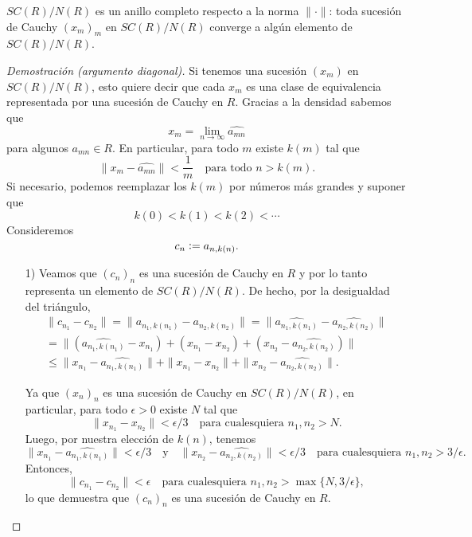 \documentclass{article}
\numberwithin{equation}{section}
\theoremstyle{definition}
\begin{document}
\begin{lema}
  $SC (R) / N (R)$ es un anillo completo respecto a la norma $\|\cdot\|$:
  toda sucesión de Cauchy $(x_m)_m$ en $SC (R)/N (R)$ converge a algún elemento
  de $SC (R)/N (R)$.

  \begin{proof}[Demostración (argumento diagonal)]
    Si tenemos una sucesión $(x_m)$ en $SC (R)/N (R)$, esto quiere decir que
    cada $x_m$ es una clase de equivalencia representada por una sucesión
    de Cauchy en $R$. Gracias a la densidad sabemos que
    $$x_m = \lim_{n\to\infty} \widehat{a_{mn}}$$
    para algunos $a_{mn}\in R$. En particular, para todo $m$ existe $k (m)$ tal
    que
    $$\|x_m - \widehat{a_{mn}}\| < \frac{1}{m}\quad\text{para todo }n > k (m).$$
    Si necesario, podemos reemplazar los $k (m)$ por números más grandes
    y suponer que
    $$k (0) < k (1) < k (2) < \cdots$$
    Consideremos
    $$c_n \mathrel{\mathop:}= a_{n,k(n)}.$$

    \begin{enumerate}
    \item[1)] Veamos que $(c_n)_n$ es una sucesión de Cauchy en $R$
      y por lo tanto representa un elemento de $SC (R)/N(R)$.
      De hecho, por la desigualdad del triángulo,
      \begin{multline*}
        \|c_{n_1} - c_{n_2}\| =
        \|a_{n_1,k(n_1)} - a_{n_2,k(n_2)}\| =
        \|\widehat{a_{n_1,k(n_1)}} - \widehat{a_{n_2,k(n_2)}}\| \\
      = \|(\widehat{a_{n_1,k(n_1)}} - x_{n_1}) + (x_{n_1} - x_{n_2}) + (x_{n_2} - \widehat{a_{n_2,k(n_2)}})\| \\
    \le \|x_{n_1} - \widehat{a_{n_1,k(n_1)}}\| + \|x_{n_1} - x_{n_2}\| + \|x_{n_2} - \widehat{a_{n_2,k(n_2)}}\|.
      \end{multline*}

      Ya que $(x_n)_n$ es una sucesión de Cauchy en $SC (R) / N (R)$,
      en particular, para todo $\epsilon > 0$ existe $N$ tal que
      $$\|x_{n_1} - x_{n_2}\| < \epsilon/3\quad\text{para cualesquiera }n_1,n_2 > N.$$
      Luego, por nuestra elección de $k (n)$, tenemos
      \[ \|x_{n_1} - \widehat{a_{n_1,k(n_1)}}\| < \epsilon/3
         \quad\text{y}\quad
         \|x_{n_2} - \widehat{a_{n_2,k(n_2)}}\| < \epsilon/3
         \quad\text{para cualesquiera }n_1,n_2 > 3/\epsilon. \]
      Entonces,
      \[ \|c_{n_1} - c_{n_2}\| < \epsilon
         \quad\text{para cualesquiera }n_1, n_2 > \max \{ N, 3/\epsilon \}, \]
      lo que demuestra que $(c_n)_n$ es una sucesión de Cauchy en $R$.


\end{enumerate}
\end{proof}
\end{lema}
\end{document}
